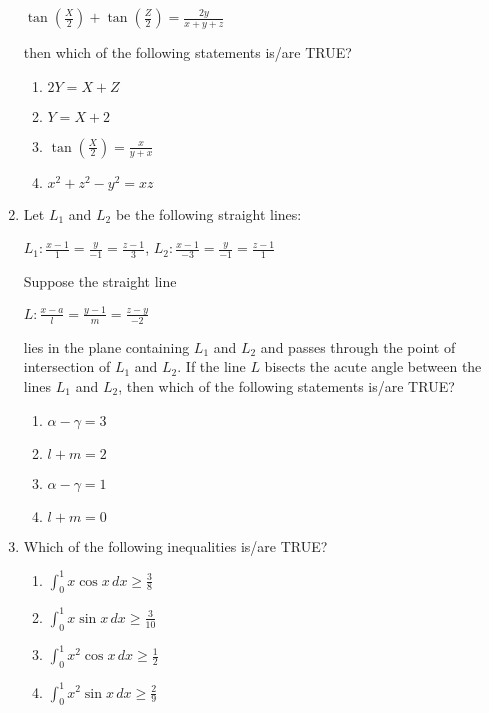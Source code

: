 \documentclass{article}
\begin{document}
\begin{enumerate}
\begin{center}
    $\tan\left(\frac{X}{2}\right) + \tan\left(\frac{Z}{2}\right) = \frac{2y}{x + y + z}$
\end{center}

    then which of the following statements is/are TRUE?

    \begin{enumerate}
        \item  $2Y = X + Z$
        \item  $Y = X + 2$
        \item  $\tan\left(\frac{X}{2}\right) = \frac{x}{y + x}$
        \item  $x^2 + z^2 - y^2 = xz$
    \end{enumerate}

\item   Let $L_1$ and $L_2$ be the following straight lines:

\begin{center}
    $L_1 :\frac{x - 1}{1} = \frac{y}{-1} = \frac{z - 1}{3}$, \quad 
    $L_2 : \frac{x - 1}{-3} = \frac{y}{-1} = \frac{z - 1}{1}$
\end{center}

    Suppose the straight line 

\begin{center}
    $L : \frac{x - a}{l} = \frac{y - 1}{m} = \frac{z - y}{-2}$
\end{center}

    lies in the plane containing $L_1$ and $L_2$ and passes through the point of intersection of $L_1$ and $L_2$. If the line $L$ bisects the acute angle between the lines $L_1$ and $L_2$, then which of the following statements is/are TRUE?

    \begin{enumerate}
        \item  $\alpha - \gamma = 3$
        \item  $l + m = 2$
        \item  $\alpha - \gamma = 1$
        \item  $l + m = 0$
    \end{enumerate}

\item   Which of the following inequalities is/are TRUE?

    \begin{enumerate}
        \item  $\int_0^1 x \cos x \,dx \geq \frac{3}{8}$
        \item  $\int_0^1 x \sin x \,dx \geq \frac{3}{10}$
        \item  $\int_0^1 x^2 \cos x \,dx \geq \frac{1}{2}$
        \item  $\int_0^1 x^2 \sin x \,dx \geq \frac{2}{9}$
    \end{enumerate}


\end{enumerate}
\end{document}
